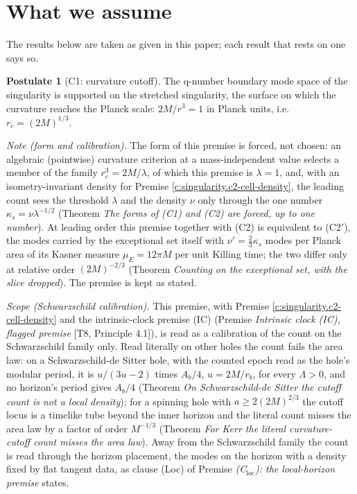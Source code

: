 \documentclass[11pt]{article}
\theoremstyle{definition}
\newtheorem{postulate}[theorem]{Postulate}
\theoremstyle{plain}
\newcommand{\changedmark}[2]{\marginpar{\raggedright\scriptsize\color{#1}#2}}
\begin{document}
\section*{What we assume}
The results below are taken as given in this paper; each result that rests on one says so.
\begin{postulate}[C1: curvature cutoff]\label{c:singularity.c1-curvature-cutoff}
\changedmark{BurntOrange}{changed since the deposit}
The q-number boundary mode space of the singularity is supported on the stretched singularity, the surface on which the curvature reaches the Planck scale: $2M/r^3 = 1$ in Planck units, i.e.\ $r_c = (2M)^{1/3}$.

\emph{Note (form and calibration).} The form of this premise is forced, not chosen: an algebraic (pointwise) curvature criterion at a mass-independent value selects a member of the family $r_c^{3} = 2M/\lambda$, of which this premise is $\lambda = 1$, and, with an isometry-invariant density for Premise \ref{c:singularity.c2-cell-density}, the leading count sees the threshold $\lambda$ and the density $\nu$ only through the one number $\kappa_{s} = \nu\lambda^{-1/2}$ (Theorem \emph{The forms of (C1) and (C2) are forced, up to one number}). At leading order this premise together with (C2) is equivalent to (C2$'$), the modes carried by the exceptional set itself with $\nu' = \tfrac23\kappa_{s}$ modes per Planck area of its Kasner measure $\mu_{E} = 12\pi M$ per unit Killing time; the two differ only at relative order $(2M)^{-2/3}$ (Theorem \emph{Counting on the exceptional set, with the slice dropped}). The premise is kept as stated.

\emph{Scope (Schwarzschild calibration).} This premise, with Premise \ref{c:singularity.c2-cell-density} and the intrinsic-clock premise (IC) (Premise \emph{Intrinsic clock (IC), flagged premise} [T8, Principle 4.1]), is read as a calibration of the count on the Schwarzschild family only. Read literally on other holes the count fails the area law: on a Schwarzschild-de Sitter hole, with the counted epoch read as the hole's modular period, it is $u/(3u - 2)$ times $A_{b}/4$, $u = 2M/r_{b}$, for every $\Lambda > 0$, and no horizon's period gives $A_{b}/4$ (Theorem \emph{On Schwarzschild-de Sitter the cutoff count is not a local density}); for a spinning hole with $a \ge 2(2M)^{2/3}$ the cutoff locus is a timelike tube beyond the inner horizon and the literal count misses the area law by a factor of order $M^{-1/3}$ (Theorem \emph{For Kerr the literal curvature-cutoff count misses the area law}). Away from the Schwarzschild family the count is read through the horizon placement, the modes on the horizon with a density fixed by flat tangent data, as clause (Loc) of Premise \emph{(C$_{\mathrm{loc}}$): the local-horizon premise} states.
\end{postulate}
\end{document}
